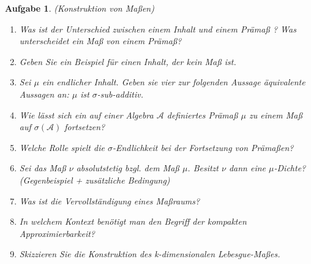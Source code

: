 \documentclass[11pt, a4paper, ngerman]{article}
\newtheorem{aufgabe}{Aufgabe}
\begin{document}
\begin{aufgabe} (Konstruktion von Maßen)
   \begin{enumerate}
        \item 
        Was ist der Unterschied zwischen einem Inhalt und einem Prämaß ? Was unterscheidet ein Maß von einem Prämaß?
        \item 
        Geben Sie ein Beispiel für einen Inhalt, der kein Maß ist. 
        \item 
        Sei $\mu$ ein endlicher Inhalt. Geben sie vier zur folgenden Aussage äquivalente Aussagen an: $\mu$ ist $\sigma$-sub-additiv. 
        \item 
        Wie lässt sich ein auf einer Algebra $\mathcal{A}$ definiertes Prämaß $\mu$ zu einem Maß auf $\sigma(\mathcal{A})$ fortsetzen?
        \item 
        Welche Rolle spielt die  $\sigma$-Endlichkeit bei der Fortsetzung von Prämaßen?
        \item 
        Sei das Maß $\nu$ absolutstetig bzgl. dem Maß $\mu$. Besitzt $\nu$ dann eine $\mu$-Dichte?
        (Gegenbeispiel + zusätzliche Bedingung)
        \item 
        Was ist die Vervollständigung eines Maßraums? 
        \item 
        In welchem Kontext benötigt man den Begriff der kompakten Approximierbarkeit?
        \item 
        Skizzieren Sie die Konstruktion des k-dimensionalen Lebesgue-Maßes. 
        
   \end{enumerate}
\end{aufgabe}
\end{document}
